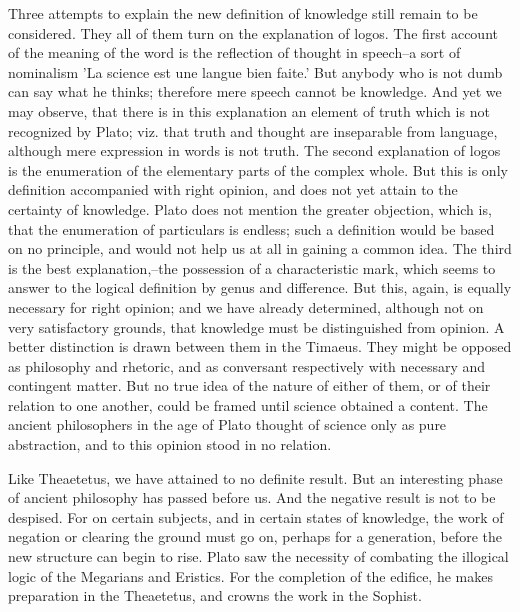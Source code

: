 Three attempts to explain the new definition of knowledge still remain
to be considered. They all of them turn on the explanation of logos. The
first account of the meaning of the word is the reflection of thought in
speech--a sort of nominalism 'La science est une langue bien faite.' But
anybody who is not dumb can say what he thinks; therefore mere speech
cannot be knowledge. And yet we may observe, that there is in this
explanation an element of truth which is not recognized by Plato; viz.
that truth and thought are inseparable from language, although mere
expression in words is not truth. The second explanation of logos is the
enumeration of the elementary parts of the complex whole. But this is
only definition accompanied with right opinion, and does not yet attain
to the certainty of knowledge. Plato does not mention the greater
objection, which is, that the enumeration of particulars is endless;
such a definition would be based on no principle, and would not help us
at all in gaining a common idea. The third is the best explanation,--the
possession of a characteristic mark, which seems to answer to the
logical definition by genus and difference. But this, again, is equally
necessary for right opinion; and we have already determined, although
not on very satisfactory grounds, that knowledge must be distinguished
from opinion. A better distinction is drawn between them in the Timaeus.
They might be opposed as philosophy and rhetoric, and as conversant
respectively with necessary and contingent matter. But no true idea of
the nature of either of them, or of their relation to one another, could
be framed until science obtained a content. The ancient philosophers
in the age of Plato thought of science only as pure abstraction, and to
this opinion stood in no relation.

Like Theaetetus, we have attained to no definite result. But an
interesting phase of ancient philosophy has passed before us. And the
negative result is not to be despised. For on certain subjects, and in
certain states of knowledge, the work of negation or clearing the ground
must go on, perhaps for a generation, before the new structure can begin
to rise. Plato saw the necessity of combating the illogical logic of
the Megarians and Eristics. For the completion of the edifice, he makes
preparation in the Theaetetus, and crowns the work in the Sophist.

